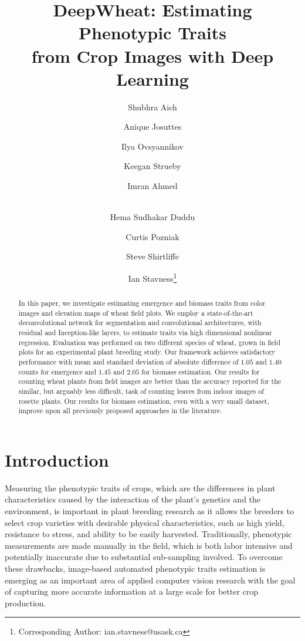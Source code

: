 \documentclass[10pt,twocolumn,letterpaper]{article}
\begin{document}
\title{DeepWheat: Estimating Phenotypic Traits \\from Crop Images with Deep Learning}


\author[1]{\vspace{-6pt}
Shubhra Aich}
\author[2]{Anique Josuttes}
\author[1]{Ilya Ovsyannikov}
\author[2]{Keegan Strueby}
\author[1]{Imran Ahmed}
\author[2]{\\Hema Sudhakar Duddu}
\author[2,3]{Curtis Pozniak}
\author[2]{Steve Shirtliffe}
\author[1]{Ian Stavness\thanks{Corresponding Author: ian.stavness@usask.ca}}






\maketitle

\ifwacvfinal\thispagestyle{empty}\fi

\begin{abstract}
In this paper, we investigate estimating emergence and biomass traits from color images and elevation maps of wheat field plots. We employ a state-of-the-art deconvolutional network for segmentation and convolutional architectures, with residual and Inception-like layers, to estimate traits via high dimensional nonlinear regression. Evaluation was performed on two different species of wheat, grown in field plots for an experimental plant breeding study. Our framework achieves satisfactory performance with mean and standard deviation of absolute difference of $1.05$ and $1.40$ counts for emergence and $1.45$ and $2.05$ for biomass estimation. Our results for counting wheat plants from field images are better than the accuracy reported for the similar, but arguably less difficult, task of counting leaves from indoor images of rosette plants. Our results for biomass estimation, even with a very small dataset, improve upon all previously proposed approaches in the literature.
\end{abstract}


\section{Introduction}

Measuring the phenotypic traits of crops, which are the differences in plant characteristics caused by the interaction of the plant's genetics and the environment, is important in plant breeding research as it allows the breeders to select crop varieties with desirable physical characteristics, such as high yield, resistance to stress, and ability to be easily harvested. Traditionally, phenotypic measurements are made manually in the field, which is both labor intensive and potentially inaccurate due to substantial sub-sampling involved. To overcome these drawbacks, image-based automated phenotypic traits estimation is emerging as an important area of applied computer vision research with the goal of capturing more accurate information at a large scale for better crop production.
\end{document}
